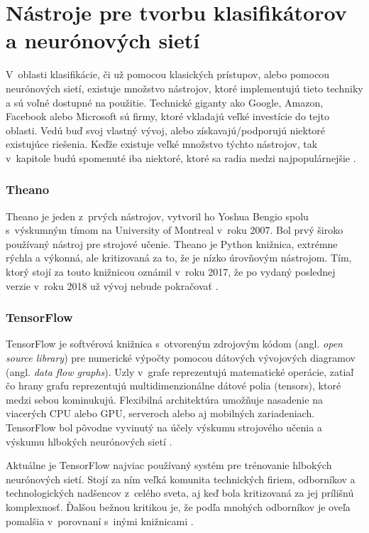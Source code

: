 
\section{Nástroje pre tvorbu klasifikátorov a neurónových sietí}
\label{sec:frameworks}
V~oblasti klasifikácie, či už pomocou klasických prístupov, alebo pomocou neurónových sietí, existuje množstvo nástrojov,
    ktoré implementujú tieto techniky a sú voľné dostupné na použitie.
Technické giganty ako Google, Amazon, Facebook alebo Microsoft sú firmy, ktoré vkladajú veľké investície do tejto oblasti.
Vedú buď svoj vlastný vývoj, alebo získavajú/podporujú niektoré existujúce riešenia.
Keďže existuje veľké množstvo týchto nástrojov, tak v~kapitole budú spomenuté iba niektoré, ktoré sa radia medzi najpopulárnejšie \cite{odkaz:FrameworkComparison}.

\subsubsection{Theano}
Theano je jeden z~prvých nástrojov, vytvoril ho Yoshua Bengio spolu s~výskumným tímom na University of Montreal v~roku 2007.
Bol prvý široko používaný nástroj pre strojové učenie.
Theano je Python knižnica, extrémne rýchla a výkonná, ale kritizovaná za to, že je nízko úrovňovým nástrojom.
Tím, ktorý stojí za touto knižnicou oznámil v~roku 2017, že po vydaný poslednej verzie v~roku 2018 už vývoj nebude pokračovať \cite{odkaz:FrameworkComparison}.

\subsubsection{TensorFlow}
TensorFlow je softvérová knižnica s~otvoreným zdrojovým kódom (angl. \textit{open source library}) pre numerické výpočty pomocou dátových vývojových diagramov (angl. \textit{data flow graphs}).
Uzly v~grafe reprezentujú matematické operácie, zatiaľ čo hrany grafu reprezentujú multidimenzionálne dátové polia (tensors), ktoré medzi sebou kominukujú.
Flexibilná architektúra umožňuje nasadenie na viacerých CPU alebo GPU, serveroch alebo aj mobilných zariadeniach.
TensorFlow bol pôvodne vyvinutý na účely výskumu strojového učenia a výskumu hlbokých neurónových sietí \cite{odkaz:TensorFlow}.

Aktuálne je TensorFlow najviac používaný systém pre trénovanie hlbokých neurónových sietí.
Stojí za ním veľká komunita technických firiem, odborníkov a technologických nadšencov z~celého sveta, aj keď bola kritizovaná za jej prílišnú komplexnosť.
Ďalšou bežnou kritikou je, že podľa mnohých odborníkov je oveľa pomalšia v~porovnaní s~inými knižnicami \cite{odkaz:FrameworkComparison}.

